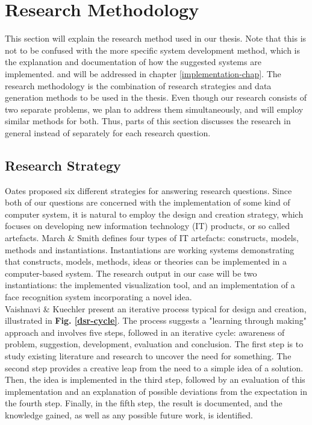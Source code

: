 \section{Research Methodology}

This section will explain the research method used in our thesis. Note that this is not to be confused with the more specific system development method, which is the explanation and documentation of how the suggested systems are implemented. and will be addressed in chapter \ref{implementation-chap}. The research methodology is the combination of research strategies and data generation methods to be used in the thesis. Even though our research consists of two separate problems, we plan to address them simultaneously, and will employ similar methods for both. Thus, parts of this section discusses the research in general instead of separately for each research question.

\subsection{Research Strategy}

Oates \cite{oates} proposed six different strategies for answering research questions. Since both of our questions are concerned with the implementation of some kind of computer system, it is natural to employ the design and creation strategy, which focuses on developing new information technology (IT) products, or so called artefacts. March \& Smith \cite{march-smith} defines four types of IT artefacts: constructs, models, methods and instantiations. Instantiations are working systems demonstrating that constructs, models, methods, ideas or theories can be implemented in a computer-based system. The research output in our case will be two instantiations: the implemented visualization tool, and an implementation of a face recognition system incorporating a novel idea. \\

\noindent Vaishnavi \& Kuechler \cite{designscience} present an iterative process typical for design and creation, illustrated in \textbf{Fig. \ref{dsr-cycle}}. The process suggests a "learning through making" approach and involves five steps, followed in an iterative cycle: awareness of problem, suggestion, development, evaluation and conclusion. The first step is to study existing literature and research to uncover the need for something. The second step provides a creative leap from the need to a simple idea of a solution. Then, the idea is implemented in the third step, followed by an evaluation of this implementation and an explanation of possible deviations from the expectation in the fourth step. Finally, in the fifth step, the result is documented, and the knowledge gained, as well as any possible future work, is identified. \\

